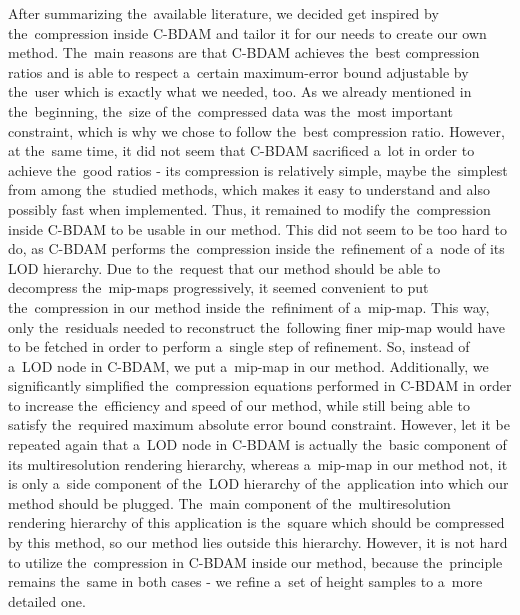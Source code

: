  After summarizing the~available literature, we decided get inspired by the~compression inside C-BDAM and tailor it for our needs to create our own method. The~main reasons are that C-BDAM achieves the~best compression ratios and is able to respect a~certain maximum-error bound adjustable by the~user which is exactly what we needed, too. As we already mentioned in the~beginning, the~size of the~compressed data was the~most important constraint, which is why we chose to follow the~best compression ratio. However, at the~same time, it did not seem that C-BDAM sacrificed a~lot in order to achieve the~good ratios - its compression is relatively simple, maybe the~simplest from among the~studied methods, which makes it easy to understand and also possibly fast when implemented. Thus, it remained to modify the~compression inside C-BDAM to be usable in our method. This did not seem to be too hard to do, as C-BDAM performs the~compression inside the~refinement of a~node of its LOD hierarchy. Due to the~request that our method should be able to decompress the~mip-maps progressively, it seemed convenient to put the~compression in our method inside the~refiniment of a~mip-map. This way, only the~residuals needed to reconstruct the~following finer mip-map would have to be fetched in order to perform a~single step of refinement. So, instead of a~LOD node in C-BDAM, we put a~mip-map in our method.  Additionally, we significantly simplified the~compression equations performed in C-BDAM in order to increase the~efficiency and speed of our method, while still being able to satisfy the~required maximum absolute error bound constraint. However, let it be repeated again that a~LOD node in C-BDAM is actually the~basic component of its multiresolution rendering hierarchy, whereas a~mip-map in our method not, it is only a~side component of the~LOD hierarchy of the~application into which our method should be plugged. The~main component of the~multiresolution rendering hierarchy of this application is the~square which should be compressed by this method, so our method lies outside this hierarchy. However, it is not hard to utilize the~compression in C-BDAM inside our method, because the~principle remains the~same in both cases - we refine a~set of height samples to a~more detailed one.
